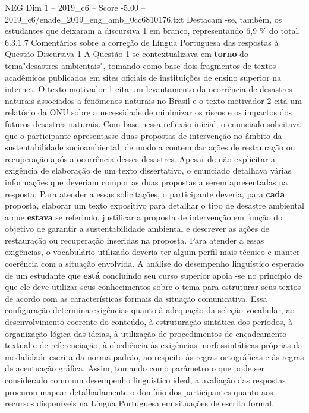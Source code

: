 \begin{textsample}{NEG Dim 1 – 2019\_c6 – Score -5.00 – 2019\_c6/enade\_2019\_eng\_amb\_0cc6810176.txt}
Destacam -se, também, os estudantes que deixaram a discursiva 1 em branco, representando 6,9 \% do total. 6.3.1.7 Comentários sobre a correção de Língua Portuguesa das respostas à Questão Discursiva 1 A Questão 1 se contextualizava em \textbf{torno} do tema"desastres ambientais", tomando como base dois fragmentos de textos acadêmicos publicados em sites oficiais de instituições de ensino superior na internet.
O texto motivador 1 cita um levantamento da ocorrência de desastres naturais associados a fenômenos naturais no Brasil e o texto motivador 2 cita um relatório da ONU sobre a necessidade de minimizar os riscos e os impactos dos futuros desastres naturais.
Com base nessa reflexão inicial, o enunciado solicitava que o participante apresentasse duas propostas de intervenção no âmbito da sustentabilidade socioambiental, de modo a contemplar ações de restauração ou recuperação após a ocorrência desses desastres.
Apesar de não explicitar a exigência de elaboração de um texto dissertativo, o enunciado detalhava várias informações que deveriam compor as duas propostas a serem apresentadas na resposta.
Para atender a essas solicitações, o participante deveria, para \textbf{cada} proposta, elaborar um texto expositivo para detalhar o tipo de desastre ambiental a que \textbf{estava} se referindo, justificar a proposta de intervenção em função do objetivo de garantir a sustentabilidade ambiental e descrever as ações de restauração ou recuperação inseridas na proposta.
Para atender a essas exigências, o vocabulário utilizado deveria ter algum perfil mais técnico e manter coerência com a situação envolvida.
A análise do desempenho linguístico esperado de um estudante que \textbf{está} concluindo seu curso superior apoia -se no princípio de que ele deve utilizar seus conhecimentos sobre o tema para estruturar seus textos de acordo com as características formais da situação comunicativa.
Essa configuração determina exigências quanto à adequação da seleção vocabular, ao desenvolvimento coerente do conteúdo, à estruturação sintática dos períodos, à organização lógica das ideias, à utilização de procedimentos de encadeamento textual e de referenciação, à obediência às exigências morfossintáticas próprias da modalidade escrita da norma-padrão, ao respeito às regras ortográficas e às regras de acentuação gráfica.
Assim, tomando como parâmetro o que pode ser considerado como um desempenho linguístico ideal, a avaliação das respostas procurou mapear detalhadamente o domínio dos participantes quanto aos recursos disponíveis na Língua Portuguesa em situações de escrita formal.

\end{textsample}
